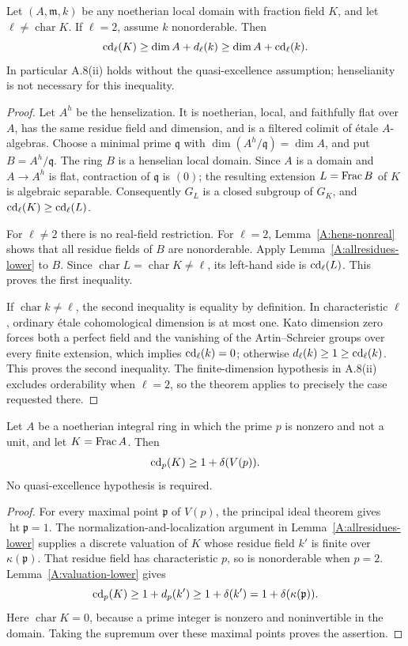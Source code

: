 \begin{theorem}
\label{A:local-lower}
Let $(A,\mathfrak m,k)$ be any noetherian local domain with fraction field $K$, and let $\ell\neq\operatorname{char}K$. If $\ell=2$, assume $k$ nonorderable. Then
\[
\operatorname{cd}_\ell(K)\geq\dim A+d_\ell(k)
\geq\dim A+\operatorname{cd}_\ell(k).
\]
In particular A.8(ii) holds without the quasi-excellence assumption; henselianity is not necessary for this inequality.
\end{theorem}
\begin{proof}
Let $A^h$ be the henselization. It is noetherian, local, and faithfully flat over $A$, has the same residue field and dimension, and is a filtered colimit of étale $A$-algebras. Choose a minimal prime $\mathfrak q$ with $\dim(A^h/\mathfrak q)=\dim A$, and put $B=A^h/\mathfrak q$. The ring $B$ is a henselian local domain. Since $A$ is a domain and $A\to A^h$ is flat, contraction of $\mathfrak q$ is $(0)$; the resulting extension $L=\operatorname{Frac} B$ of $K$ is algebraic separable. Consequently $G_L$ is a closed subgroup of $G_K$, and $\operatorname{cd}_\ell(K)\geq\operatorname{cd}_\ell(L)$.

For $\ell\neq2$ there is no real-field restriction. For $\ell=2$, Lemma~\ref{A:hens-nonreal} shows that all residue fields of $B$ are nonorderable. Apply Lemma~\ref{A:allresidues-lower} to $B$. Since $\operatorname{char}L=\operatorname{char}K\neq\ell$, its left-hand side is $\operatorname{cd}_\ell(L)$. This proves the first inequality.

If $\operatorname{char}k\neq\ell$, the second inequality is equality by definition. In characteristic $\ell$, ordinary étale cohomological dimension is at most one. Kato dimension zero forces both a perfect field and the vanishing of the Artin--Schreier groups over every finite extension, which implies $\operatorname{cd}_\ell(k)=0$; otherwise $d_\ell(k)\geq1\geq\operatorname{cd}_\ell(k)$. This proves the second inequality. The finite-dimension hypothesis in A.8(ii) excludes orderability when $\ell=2$, so the theorem applies to precisely the case requested there.
\end{proof}

\begin{corollary}
\label{A:p-rank-margin}
Let $A$ be a noetherian integral ring in which the prime $p$ is nonzero and not a unit, and let $K=\operatorname{Frac} A$. Then
\[
\operatorname{cd}_p(K)\geq1+\delta(V(p)).
\]
No quasi-excellence hypothesis is required.
\end{corollary}
\begin{proof}
For every maximal point $\mathfrak p$ of $V(p)$, the principal ideal theorem gives $\operatorname{ht}\mathfrak p=1$. The normalization-and-localization argument in Lemma~\ref{A:allresidues-lower} supplies a discrete valuation of $K$ whose residue field $k'$ is finite over $\kappa(\mathfrak p)$. That residue field has characteristic $p$, so is nonorderable when $p=2$. Lemma~\ref{A:valuation-lower} gives
\[
\operatorname{cd}_p(K)\geq1+d_p(k')\geq1+\delta(k')
=1+\delta(\kappa(\mathfrak p)).
\]
Here $\operatorname{char}K=0$, because a prime integer is nonzero and noninvertible in the domain. Taking the supremum over these maximal points proves the assertion.
\end{proof}

